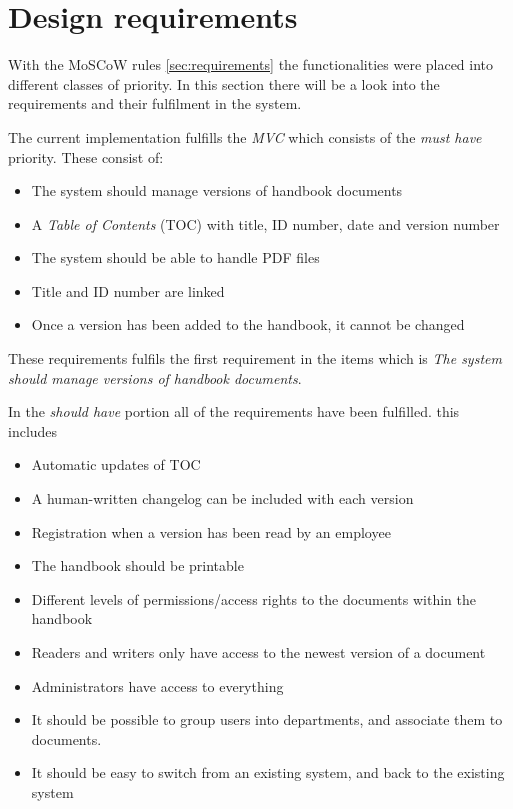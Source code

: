 \section{Design requirements}\label{sec:disdesignrequirements}
With the MoSCoW rules \cref{sec:requirements} the functionalities were placed into different classes of priority.
In this section there will be a look into the requirements and their fulfilment in the system.

The current implementation fulfills the \textit{MVC} which consists of the \textit{must have} priority.
These consist of:

\begin{itemize}
	\item 
	The system should manage versions of handbook documents
	\item 
    A \textit{Table of Contents} (TOC) with title, ID number, date and version number
    \item 
    The system should be able to handle PDF files
    \item 
    Title and ID number are linked
    \item 
    Once a version has been added to the handbook, it cannot be changed
\end{itemize}

These requirements fulfils the first requirement in the items which is \textit{The system should manage versions of handbook documents}.

In the \textit{should have} portion all of the requirements have been fulfilled.
this includes 

\begin{itemize}
	\item 
	Automatic updates of TOC
    \item 
	A human-written changelog can be included with each version
	\item 
    Registration when a version has been read by an employee
    \item 
    The handbook should be printable
    \item 
   	Different levels of permissions/access rights to the documents within the handbook
    \item 
    Readers and writers only have access to the newest version of a document
    \item 
    Administrators have access to everything
   	\item 
    It should be possible to group users into departments, and associate them to documents.
    \item 
    It should be easy to switch from an existing system, and back to the existing system
\end{itemize}

